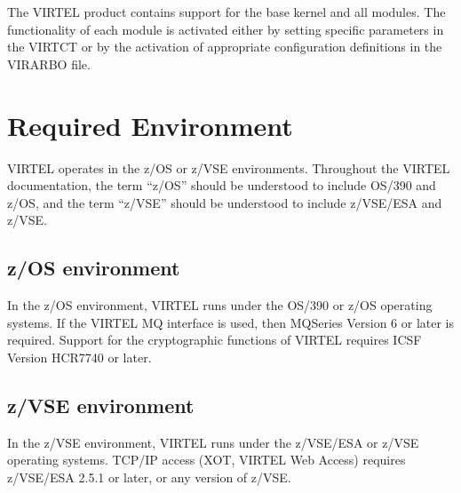 \documentclass[letterpaper,10pt,english]{sphinxmanual}
\begin{document}
The VIRTEL product contains support for the base kernel and all modules. The functionality of each module is activated either by setting specific parameters in the VIRTCT or by the activation of appropriate configuration definitions in the VIRARBO file.

\begin{DUlineblock}{0em}
\item[] 
\end{DUlineblock}

\newpage


\section{Required Environment}
\label{\detokenize{Installation_Guide:required-environment}}\label{\detokenize{Installation_Guide:index-1}}
VIRTEL operates in the z/OS or z/VSE environments. Throughout the VIRTEL documentation, the term “z/OS” should be understood to include OS/390 and z/OS, and the term “z/VSE” should be understood to include z/VSE/ESA and z/VSE.


\subsection{z/OS environment}
\label{\detokenize{Installation_Guide:z-os-environment}}
In the z/OS environment, VIRTEL runs under the OS/390 or z/OS operating systems. If the VIRTEL MQ interface is used, then MQSeries Version 6 or later is required. Support for the cryptographic functions of VIRTEL requires ICSF Version HCR7740 or later.


\subsection{z/VSE environment}
\label{\detokenize{Installation_Guide:z-vse-environment}}
In the z/VSE environment, VIRTEL runs under the z/VSE/ESA or z/VSE operating systems. TCP/IP access (XOT, VIRTEL Web Access) requires z/VSE/ESA 2.5.1 or later, or any version of z/VSE.

\end{document}
